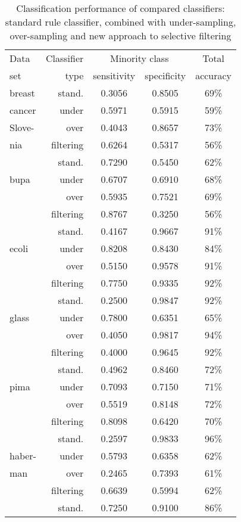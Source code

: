 \documentclass{AIMeth05}
\begin{document}
\begin{table}
 \caption{Classification performance of compared classifiers: standard rule classifier, combined with
 under-sampling, over-sampling and new approach to selective filtering } \centering
\begin{tabular}{lrccc}
\noalign{\smallskip}
\hline
\noalign{\smallskip}
  Data & Classifier & \multicolumn{2}{c}{Minority class} & Total \\
  set &  type & sensitivity & specificity & accuracy \\ \hline
 breast & stand. & 0.3056 & 0.8505 & 69\% \\
 cancer & under  & 0.5971 & 0.5915 & 59\% \\
 Slove-    & over & 0.4043 & 0.8657 &  73\% \\
 nia    & filtering & 0.6264 & 0.5317 & 56\% \\ \hline
  & stand. & 0.7290 & 0.5450 & 62\% \\
bupa &  under  & 0.6707 & 0.6910 & 68\% \\
    & over & 0.5935 & 0.7521 &  69\% \\
    & filtering & 0.8767 & 0.3250 & 56\% \\ \hline
     & stand. & 0.4167 & 0.9667 & 91\% \\
ecoli & under & 0.8208 & 0.8430 & 84\% \\
    & over & 0.5150 & 0.9578 &  91\% \\
    & filtering & 0.7750 & 0.9335 & 92\% \\ \hline
     & stand. & 0.2500 & 0.9847 & 92\% \\
glass & under & 0.7800 & 0.6351 & 65\% \\
    & over & 0.4050 & 0.9817 &  94\% \\
    & filtering & 0.4000 & 0.9645 & 92\% \\ \hline
     & stand. & 0.4962 & 0.8460 & 72\% \\
pima & under & 0.7093 & 0.7150 & 71\% \\
     & over & 0.5519 & 0.8148 &  72\% \\
    & filtering & 0.8098 & 0.6420 & 70\% \\ \hline
     & stand. & 0.2597 & 0.9833 & 96\% \\
haber- & under & 0.5793 & 0.6358 & 62\% \\
man & over & 0.2465 & 0.7393 & 61\% \\
    & filtering & 0.6639 & 0.5994 & 62\% \\ \hline
      & stand. & 0.7250 & 0.9100 & 86\% \\

\end{tabular}
\end{table}
\end{document}
